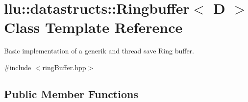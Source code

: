 \hypertarget{classllu_1_1datastructs_1_1_ringbuffer}{\section{llu\+:\+:datastructs\+:\+:Ringbuffer$<$ D $>$ Class Template Reference}
\label{classllu_1_1datastructs_1_1_ringbuffer}
}


Basic implementation of a generik and thread save Ring buffer.  




{\ttfamily \#include $<$ring\+Buffer.\+hpp$>$}

\subsection*{Public Member Functions}

